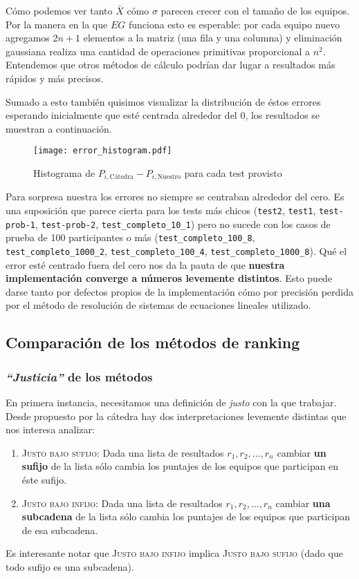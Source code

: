 \documentclass[a4paper]{article}
\begin{document}
Cómo podemos ver tanto $\bar{X}$ cómo $\sigma$ parecen crecer con el tamaño de los equipos. Por la manera en la que $EG$ funciona esto es esperable: por cada equipo nuevo agregamos $2n + 1$ elementos a la matriz (una fila y una columna) y eliminación gaussiana realiza una cantidad de operaciones primitivas proporcional a $n^2$. Entendemos que otros métodos de cálculo podrían dar lugar a resultados más rápidos y más precisos.

Sumado a esto también quisimos visualizar la distribución de éstos errores esperando inicialmente que esté centrada alrededor del 0, los resultados se muestran a continuación.
\begin{figure}[H]
    \centering
    \texttt{[image: error\_histogram.pdf]}
    \caption{Histograma de $P_{i,\text{Cátedra}} - P_{i,\text{Nuestro}}$ para cada test provisto}
    \label{fig:histerrores}
\end{figure}

Para sorpresa nuestra los errores no siempre se centraban alrededor del cero. Es una suposición que parece cierta para los tests más chicos (\texttt{test2}, \texttt{test1}, \texttt{test-prob-1}, \texttt{test-prob-2}, \texttt{test\_completo\_10\_1}) pero no sucede con los casos de prueba de 100 participantes o más (\texttt{test\_completo\_100\_8}, \texttt{test\_completo\_1000\_2}, \texttt{test\_completo\_100\_4}, \texttt{test\_completo\_1000\_8}). Qué el error esté centrado fuera del cero nos da la pauta de que \textbf{nuestra implementación converge a números levemente distintos}. Esto puede darse tanto por defectos propios de la implementación cómo por precisión perdida por el método de resolución de sistemas de ecuaciones lineales utilizado.

\subsection{Comparación de los métodos de ranking}

\subsubsection{\textit{``Justicia''} de los métodos}

En primera instancia, necesitamos una definición de \textit{justo} con la que trabajar. Desde propuesto por la cátedra hay dos interpretaciones levemente distintas que nos interesa analizar:
\begin{enumerate}
    \item \textsc{Justo bajo sufijo:} Dada una lista de resultados $r_1, r_2, \dots, r_n$ cambiar \textbf{un sufijo} de la lista sólo cambia los puntajes de los equipos que participan en éste sufijo.
    \item \textsc{Justo bajo infijo:} Dada una lista de resultados $r_1, r_2, \dots, r_n$ cambiar \textbf{una subcadena} de la lista sólo cambia los puntajes de los equipos que participan de esa subcadena.
\end{enumerate}
Es interesante notar que \textsc{Justo bajo infijo} implica \textsc{Justo bajo sufijo} (dado que todo sufijo es una subcadena).
\end{document}
